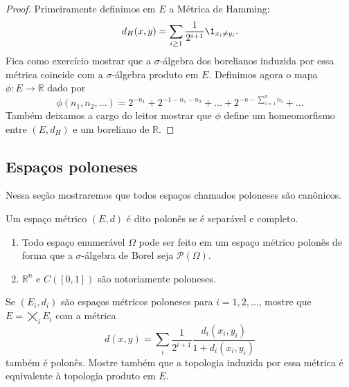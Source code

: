 \begin{proof}
  Primeiramente definimos em $E$ a Métrica de Hamming:
  \begin{equation}
    \label{e:hamming_distance}
    d_H(x,y) = \sum_{i \geq 1} \frac{1}{2^{i + 1}} \1_{x_i \neq y_i}.
  \end{equation}
  Fica como exercício mostrar que a $\sigma$-álgebra dos borelianos induzida por essa métrica coincide com a $\sigma$-álgebra produto em $E$.
  Definimos agora o mapa $\phi:E \to \mathbb{R}$ dado por
  \begin{equation}
    \phi(n_1, n_2, \dots) = 2^{-n_1} + 2^{-1 - n_1 - n_2} + \dots + 2^{-n - \sum_{i=1}^n n_i} + \dots
  \end{equation}
  Também deixamos a cargo do leitor mostrar que $\phi$ define um homeomorfismo entre $(E,d_H)$ e um boreliano de $\mathbb{R}$.
\end{proof}

\subsection{Espaços poloneses}

Nessa seção mostraremos que todos espaços chamados poloneses são canônicos.

\begin{definition}
  Um espaço métrico $(E,d)$ é dito polonês  se é separável e completo.
\end{definition}

\begin{example} \mbox{}
  \begin{enumerate}[\quad a)]
  \item Todo espaço enumerável $\Omega$ pode ser feito em um espaço métrico polonês de forma que a $\sigma$-álgebra de Borel seja $\mathcal{P}(\Omega)$.
  \item $\mathbb{R}^n$ e $C([0,1])$ são notoriamente poloneses.
  \end{enumerate}
\end{example}

\begin{exercise}
  Se $(E_i, d_i)$ são espaços métricos poloneses para $i = 1, 2, \dots$, mostre que $E = \bigtimes_i E_i$ com a métrica
  \begin{equation}
    \label{e:metrica_produto}
    d(x,y) = \sum_i \frac{1}{2^{i+1}} \frac{d_i(x_i, y_i)}{1 + d_i(x_i, y_i)}
  \end{equation}
  também é polonês.
  Mostre também que a topologia induzida por essa métrica é equivalente à topologia produto em $E$.
\end{exercise}

